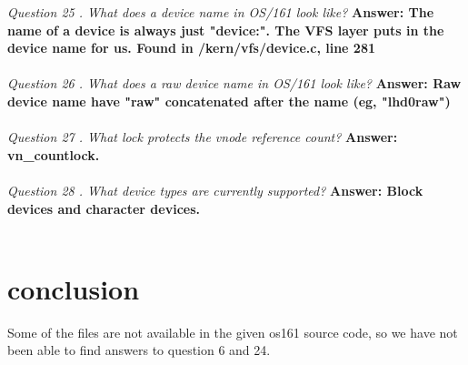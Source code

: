 \documentclass[11pt, english]{article}
\begin{document}
\textit{ Question 25 .  What does a device name in OS/161 look like? }\newline
\textbf{Answer: The name of a device is always just "device:". The VFS layer puts in the device name for us.  Found in /kern/vfs/device.c, line 281}\\ \\
\textit{ Question 26 .  What does a raw device name in OS/161 look like? }\newline
\textbf{Answer: Raw device name have "raw" concatenated after the name (eg, "lhd0raw")}\\ \\
\textit{ Question 27 .  What lock protects the vnode reference count? }\newline
\textbf{Answer: vn\_countlock.}\\ \\
\textit{ Question 28 .  What device types are currently supported?  }\newline
\textbf{Answer: Block devices and character devices.}\\ \\


\section{conclusion}
Some of the files are not available in the given os161 source code, so we have not been able to find answers to question 6 and 24.
\end{document}
